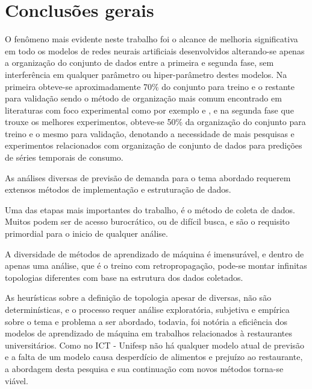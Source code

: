     \section{Conclusões gerais}
        
        
        O fenômeno mais evidente neste trabalho foi o alcance de melhoria significativa em todo os modelos de redes neurais artificiais desenvolvidos alterando-se apenas a organização do conjunto de dados entre a primeira e segunda fase, sem interferência em qualquer parâmetro ou hiper-parâmetro destes modelos. Na primeira obteve-se aproximadamente 70\% do conjunto para treino e o restante para validação sendo o método de organização mais comum encontrado em literaturas com foco experimental como por exemplo \cite{DLB} e \cite{MLM}, e na segunda fase que trouxe os melhores experimentos, obteve-se 50\% da organização do conjunto para treino e o mesmo para validação, denotando a necessidade de mais pesquisas e experimentos relacionados com organização de conjunto de dados para predições de séries temporais de consumo.
        
        As análises diversas de previsão de demanda para o tema abordado requerem extensos métodos de implementação e estruturação de dados.
        
        Uma das etapas mais importantes do trabalho, é o método de coleta de dados. Muitos podem ser de acesso burocrático, ou de difícil busca, e são o requisito primordial para o inicio de qualquer análise.
        
        A diversidade de métodos de aprendizado de máquina é imensurável, e dentro de apenas uma análise, que é o treino com retropropagação, pode-se montar infinitas topologias diferentes com base na estrutura dos dados coletados. 
        
        As heurísticas sobre a definição de topologia apesar de diversas, não são determinísticas, e o processo requer análise exploratória, subjetiva e empírica sobre o tema e problema a ser abordado, todavia, foi notória a eficiência dos modelos de aprendizado de máquina em trabalhos relacionados à restaurantes universitários. Como no ICT - Unifesp não há qualquer modelo atual de previsão e a falta de um modelo causa desperdício de alimentos e prejuízo ao restaurante, a abordagem desta pesquisa e sua continuação com novos métodos torna-se viável.
        
        
